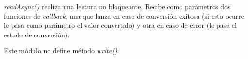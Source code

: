 \emph{readAsync()} realiza una lectura no bloqueante. Recibe como parámetros dos funciones de \emph{callback}, una que lanza en caso de conversión exitosa (si esto ocurre le pasa como parámetro el valor convertido) y otra en caso de error (le pasa el estado de conversión).

Este módulo no define método \emph{write()}.

